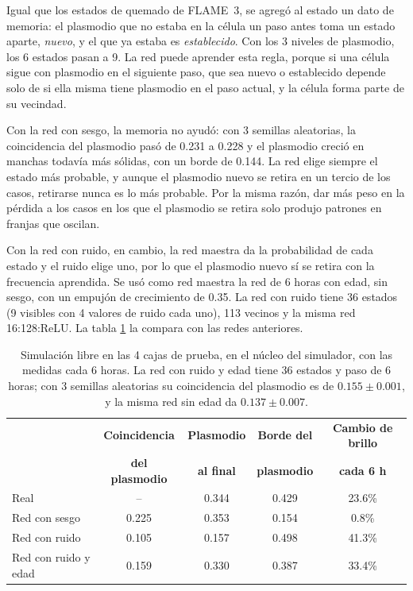 Igual que los estados de quemado de FLAME~3, se agregó al estado un dato de memoria: el plasmodio que no estaba en la célula un paso antes toma un estado aparte, \emph{nuevo}, y el que ya estaba es \emph{establecido}. Con los 3 niveles de plasmodio, los 6 estados pasan a 9. La red puede aprender esta regla, porque si una célula sigue con plasmodio en el siguiente paso, que sea nuevo o establecido depende solo de si ella misma tiene plasmodio en el paso actual, y la célula forma parte de su vecindad.

Con la red con sesgo, la memoria no ayudó: con 3 semillas aleatorias, la coincidencia del plasmodio pasó de 0.231 a 0.228 y el plasmodio creció en manchas todavía más sólidas, con un borde de 0.144. La red elige siempre el estado más probable, y aunque el plasmodio nuevo se retira en un tercio de los casos, retirarse nunca es lo más probable. Por la misma razón, dar más peso en la pérdida a los casos en los que el plasmodio se retira solo produjo patrones en franjas que oscilan.

Con la red con ruido, en cambio, la red maestra da la probabilidad de cada estado y el ruido elige uno, por lo que el plasmodio nuevo sí se retira con la frecuencia aprendida. Se usó como red maestra la red de 6 horas con edad, sin sesgo, con un empujón de crecimiento de 0.35. La red con ruido tiene 36 estados (9 visibles con 4 valores de ruido cada uno), 113 vecinos y la misma red 16:128:ReLU. La tabla \ref{tab:physarum_comparacion_edad} la compara con las redes anteriores.

\begin{table}[htbp]
	\centering
	\footnotesize
	\setlength{\tabcolsep}{4pt}
	\begin{tabular}{@{}lcccc@{}}
		\toprule
		& \textbf{Coincidencia} & \textbf{Plasmodio} & \textbf{Borde del} & \textbf{Cambio de brillo} \\
		& \textbf{del plasmodio} & \textbf{al final} & \textbf{plasmodio} & \textbf{cada 6 h} \\ \midrule
		Real & -- & 0.344 & 0.429 & 23.6\% \\
		Red con sesgo & 0.225 & 0.353 & 0.154 & 0.8\% \\
		Red con ruido & 0.105 & 0.157 & 0.498 & 41.3\% \\
		Red con ruido y edad & 0.159 & 0.330 & 0.387 & 33.4\% \\
		\bottomrule
	\end{tabular}
	\caption{Simulación libre en las 4 cajas de prueba, en el núcleo del simulador, con las medidas cada 6 horas. La red con ruido y edad tiene 36 estados y paso de 6 horas; con 3 semillas aleatorias su coincidencia del plasmodio es de $0.155 \pm 0.001$, y la misma red sin edad da $0.137 \pm 0.007$.}
	\label{tab:physarum_comparacion_edad}
\end{table}

